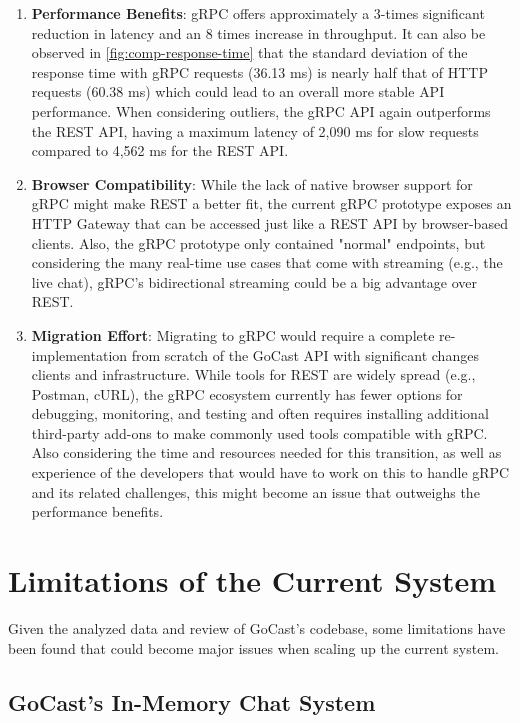 \begin{enumerate}
    \item \textbf{Performance Benefits}: gRPC offers approximately a 3-times significant reduction in latency and an 8 times increase in throughput. It can also be observed in \autoref{fig:comp-response-time} that the standard deviation of the response time with gRPC requests (36.13 ms) is nearly half that of HTTP requests (60.38 ms) which could lead to an overall more stable \ac{API} performance.  When considering outliers, the gRPC \ac{API} again outperforms the REST \ac{API}, having a maximum latency of 2,090 ms for slow requests compared to 4,562 ms for the REST \ac{API}.

    \item \textbf{Browser Compatibility}: While the lack of native browser support for gRPC might make REST a better fit, the current gRPC prototype exposes an HTTP Gateway that can be accessed just like a REST \ac{API} by browser-based clients. Also, the gRPC prototype only contained "normal" endpoints, but considering the many real-time use cases that come with streaming (e.g., the live chat), gRPC’s bidirectional streaming could be a big advantage over REST.

    \item \textbf{Migration Effort}: Migrating to gRPC would require a complete re-implementation from scratch of the GoCast \ac{API} with significant changes clients and infrastructure. While tools for REST are widely spread (e.g., Postman, cURL), the gRPC ecosystem currently has fewer options for debugging, monitoring, and testing and often requires installing additional third-party add-ons to make commonly used tools compatible with gRPC. Also considering the time and resources needed for this transition, as well as experience of the developers that would have to work on this to handle gRPC and its related challenges, this might become an issue that outweighs the performance benefits.
\end{enumerate}

\section{Limitations of the Current System}

Given the analyzed data and review of GoCast's codebase, some limitations have been found that could become major issues when scaling up the current system.

\subsection{GoCast's In-Memory Chat System}


